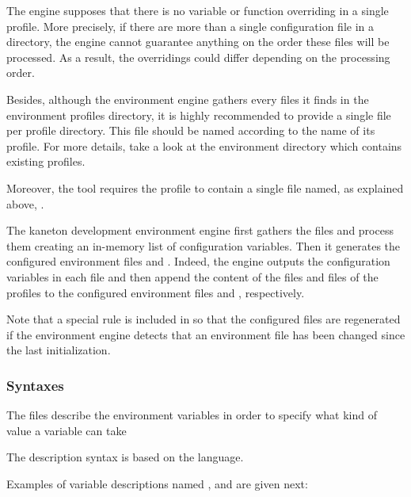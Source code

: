 The engine supposes that there is no variable or function overriding in
a single profile. More precisely, if there are more than a single
configuration file in a directory, the engine cannot guarantee anything
on the order these files will be processed. As a result, the overridings
could differ depending on the processing order.

Besides, although the environment engine gathers every 
files it finds in the environment profiles directory, it is highly recommended
to provide a single  file per profile directory. This
file should be named according to the name of its profile. For more details,
take a look at the environment directory which contains existing profiles.

Moreover, the  tool requires the  profile to
contain a single  file named, as explained above,
.

The kaneton development environment engine first gathers the
 files and process them creating an in-memory list of
configuration variables. Then it generates the configured environment files
 and . Indeed, the engine outputs the
configuration variables in each file and then append the content of the
 files and  files of the profiles to the
configured environment files  and ,
respectively.

Note that a special rule is included in  so that the
configured files are regenerated if the environment engine detects that
an environment file has been changed since the last initialization.

%
%

\subsubsection{Syntaxes}



The  files describe the environment variables in order
to specify what kind of value a variable can take \etc{}

The description syntax is based on the  language.

Examples of variable descriptions named , 
and  are given next:

